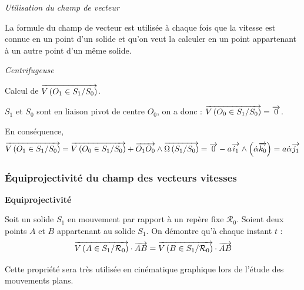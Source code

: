 \documentclass[10pt,oneside]{article}
\begin{document}
\begin{rem}
\textit{Utilisation du champ de vecteur}

La formule du champ de vecteur est utilisée à chaque fois que la vitesse est connue en un point d'un solide et qu'on veut la calculer en un point appartenant à un autre point d'un même solide. 
\end{rem}

\begin{exemple}
\textit{Centrifugeuse}

Calcul de $\overrightarrow{V\left( {O_1} \in {S_1}/{S_0}\right)}$.

$S_1$ et $S_0$ sont en liaison pivot de centre $O_0$, on a donc :  $\overrightarrow{V\left( {O_0} \in {S_1}/{S_0}\right)}=\overrightarrow{0}$.

En conséquence, 
$$
\overrightarrow{V\left( {O_1} \in {S_1}/{S_0}\right)} = \overrightarrow{V\left( {O_0} \in {S_1}/{S_0}\right)} + \overrightarrow{O_1O_0}\wedge   \overrightarrow{\Omega\left( {S_1}/{S_0}\right)} = \overrightarrow{0} - a \overrightarrow{i_1} \wedge \left( \dot{\alpha}\overrightarrow{k_0} \right)
=a \dot{\alpha}\overrightarrow{j_1}
$$


\end{exemple}
\subsubsection{\'Equiprojectivité du champ des vecteurs vitesses}

\begin{resultat}
\textbf{Equiprojectivité}

Soit un solide $S_1$ en mouvement par rapport à un repère fixe $\mathcal{R}_0$. Soient deux points $A$ et $B$ appartenant au solide $S_1$. On démontre qu'à chaque instant $t$ :
$$
\overrightarrow{V\left( {A} \in {S_1}/{\mathcal{R}_0}\right)}\cdot \overrightarrow{AB} = 
\overrightarrow{V\left( {B} \in {S_1}/{\mathcal{R}_0}\right)}\cdot \overrightarrow{AB}
$$
\end{resultat}

\begin{rem}
Cette propriété sera très utilisée en cinématique graphique lors de l'étude des mouvements plans.
\end{rem}
\end{document}
